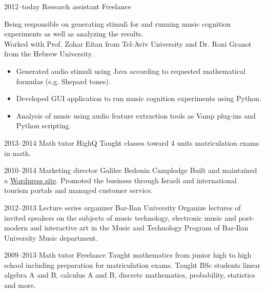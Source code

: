 \documentclass[]{friggeri-cv}  %
\begin{document}
\begin{entrylist}

    \entry
    {2012--today}
    {Research assistant}
    {Freelance}
    {Being responsible on generating stimuli for and running music cognition experiments as well as analyzing the results.\\
    Worked with Prof. Zohar Eitan from Tel-Aviv University and Dr. Roni Granot from the Hebrew University.
    \begin{itemize}
    \item Generated audio stimuli using Java according to requested mathematical formulas (e.g. Shepard tones).
    \item Developed GUI application to run music cognition experiments using Python.
    \item Analysis of music using audio feature extraction tools as Vamp plug-ins and Python scripting.
    \end{itemize}}
    
\end{entrylist}
\begin{entrylist}
    
    \entry
    {2013--2014}
    {Math tutor}
    {HighQ}
    {Taught classes toward 4 units matriculation exams in math.}
    
\end{entrylist}
\begin{entrylist}
    
    \entry
    {2010--2014}
    {Marketing director}
    {Galilee Bedouin Camplodge}
    {Built and maintained a \href{http://www.shevet-ahim.co.il/en)}{Wordpress site}.
    Promoted the business through Israeli and international tourism portals and managed customer service.}
    
\end{entrylist}
\begin{entrylist}

    \entry
    {2012--2013}
    {Lecture series organizer}
    {Bar-Ilan University}
    {Organize lectures of invited speakers on the subjects of music technology, electronic music and post-modern and interactive art in the Music and Technology Program of Bar-Ilan University Music department.}

\end{entrylist}
\begin{entrylist}

    \entry
    {2009--2013}
    {Math tutor}
    {Freelance}
    {Taught mathematics from junior high to high school including preparation for matriculation exams. Taught BSc students linear algebra A and B, calculus A and B, discrete mathematics, probability, statistics and more.}

\end{entrylist}
\end{document}
